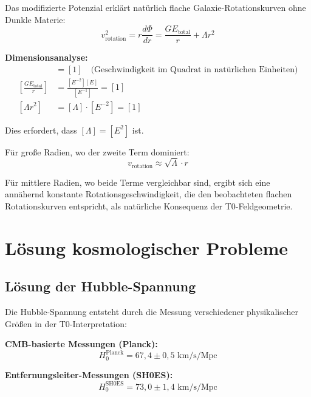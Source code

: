 \documentclass[12pt,a4paper]{report}
\begin{document}
Das modifizierte Potenzial erklärt natürlich flache Galaxie-Rotationskurven ohne Dunkle Materie:
\begin{equation}
	v_{\text{rotation}}^2 = r \frac{d\Phi}{dr} = \frac{GE_{\text{total}}}{r} + \Lambda r^2
\end{equation}

\textbf{Dimensionsanalyse:}
\begin{align}
	[v_{\text{rotation}}^2] &= [1] \quad \text{(Geschwindigkeit im Quadrat in natürlichen Einheiten)} \\
	\left[\frac{GE_{\text{total}}}{r}\right] &= \frac{[E^{-2}][E]}{[E^{-1}]} = [1] \\
	[\Lambda r^2] &= [\Lambda] \cdot [E^{-2}] = [1]
\end{align}

Dies erfordert, dass $[\Lambda] = [E^2]$ ist.

Für große Radien, wo der zweite Term dominiert:
\begin{equation}
	v_{\text{rotation}} \approx \sqrt{\Lambda} \cdot r
\end{equation}

Für mittlere Radien, wo beide Terme vergleichbar sind, ergibt sich eine annähernd konstante Rotationsgeschwindigkeit, die den beobachteten flachen Rotationskurven entspricht, als natürliche Konsequenz der T0-Feldgeometrie.
	\section{Lösung kosmologischer Probleme}
	\label{sec:cosmological_problems}
	
	\subsection{Lösung der Hubble-Spannung}
	\label{subsec:hubble_tension_resolution}
	
	Die Hubble-Spannung entsteht durch die Messung verschiedener physikalischer Größen in der T0-Interpretation:
	
	\textbf{CMB-basierte Messungen (Planck):}
	\begin{equation}
		H_0^{\text{Planck}} = 67,4 \pm 0,5 \text{ km/s/Mpc}
	\end{equation}
	
	\textbf{Entfernungsleiter-Messungen (SH0ES):}
	\begin{equation}
		H_0^{\text{SH0ES}} = 73,0 \pm 1,4 \text{ km/s/Mpc}
	\end{equation}
	
\end{document}
